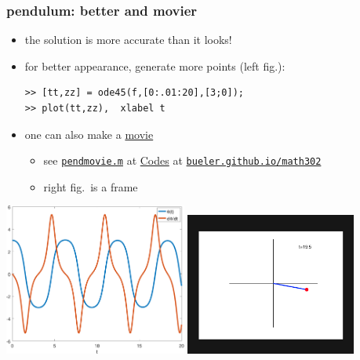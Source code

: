 \documentclass[urlcolor=blue,dvipsnames]{beamer}
\begin{document}
\begin{frame}[fragile]
\frametitle{pendulum: better and movier}

\small
\begin{itemize}
\item the solution is more accurate than it looks!
\item for better appearance, generate more points (left fig.):
\begin{Verbatim}[fontsize=\small]
>> [tt,zz] = ode45(f,[0:.01:20],[3;0]);
>> plot(tt,zz),  xlabel t
\end{Verbatim}
\item one can also make a \href{https://bueler.github.io/math302/assets/codes/pendmovie.gif}{movie}
    \begin{itemize}
    \item see \href{https://bueler.github.io/math302/assets/codes/pendmovie.m}{\texttt{pendmovie.m}} at \href{https://bueler.github.io/math302/codes.html}{Codes} at \href{https://bueler.github.io/math302/}{\texttt{bueler.github.io/math302}}
    \item right fig.~is a frame
    \end{itemize}
\end{itemize}

\includegraphics[width=0.45\textwidth]{figs/pend-smooth} \hfill \includegraphics[width=0.42\textwidth]{figs/pend-snap}
\end{frame}
\end{document}
